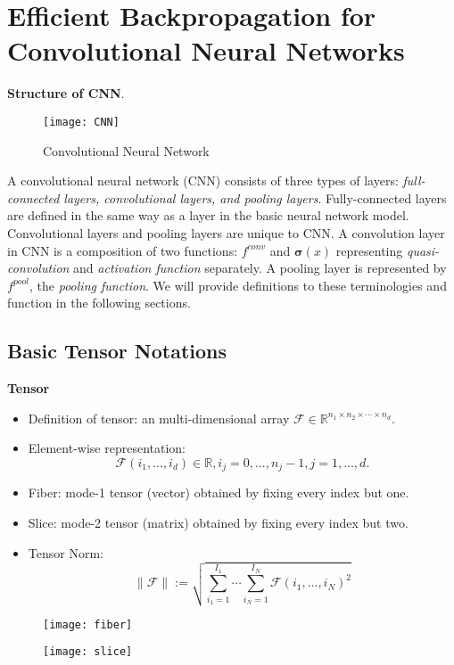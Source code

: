 \chapter{Efficient Backpropagation for Convolutional Neural Networks}

{\bf Structure of CNN}.
\begin{figure}[ht]
\centering
\texttt{[image: CNN]}
\caption{Convolutional Neural Network}
\end{figure}
A convolutional neural network (CNN) consists of three types of layers: \textit{full-connected layers, convolutional layers, and pooling layers}. Fully-connected layers are defined in the same way as a layer in the basic neural network model. Convolutional layers and pooling layers are unique to CNN. A convolution layer in CNN is a composition of two functions: $f^{conv}$ and ${\bm\sigma(x)}$ representing \textit{quasi-convolution} and \textit{activation function} separately. A pooling layer is represented by $f^{pool}$, the \textit{pooling function}. We will provide definitions to these terminologies and function in the following sections.

\section{Basic Tensor Notations}

{\bf Tensor}
\begin{itemize}
\item
Definition of tensor: an multi-dimensional array $\mathcal{F}\in\mathbb{R}^{n_1\times n_2\times\cdots\times n_d}$.
\item
Element-wise representation: 
$$
\mathcal{F}(i_1,...,i_d)\in\mathbb{R}, i_j=0,...,n_j-1, j=1,...,d.
$$
\item
Fiber: mode-1 tensor (vector) obtained by fixing every index but one.
\item
Slice: mode-2 tensor (matrix) obtained by fixing every index but two.
\item
Tensor Norm: 
$$
\|\mathcal{F}\| := \sqrt{\sum_{i_1=1}^{I_1}\cdots\sum_{i_N=1}^{I_N} \mathcal{F}(i_1,...,i_N)^2}
$$
\end{itemize}
\begin{figure}[ht]
\centering
\texttt{[image: fiber]}
\end{figure}
\begin{figure}[ht]
\centering
\texttt{[image: slice]}
\end{figure}

